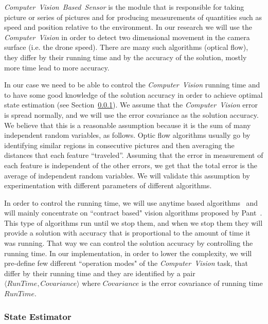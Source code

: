 \documentclass[11pt]{article}
\begin{document}
\textit{Computer~Vision~Based~Sensor} is the module that is responsible for taking picture or series of pictures and for producing measurements of quantities such as speed and position relative to the environment.
In our research we will use the \textit{Computer~Vision} in order to detect two dimensional movement in the camera surface (i.e. the drone speed).
There are many such algorithms (optical flow), they differ by their running time and by the accuracy of the solution, mostly more time lead to more accuracy.

In our case we need to be able to control the \textit{Computer~Vision} running time and to have some good knowledge of the solution accuracy in order to achieve optimal state estimation (see Section~\ref{sec:estimator}).
We assume that the \textit{Computer~Vision} error is spread normally, and we will use the error covariance as the solution accuracy. 
We believe that this is a reasonable  assumption because it is the sum of many independent random variables, as follows. Optic flow algorithms usually go by identifying similar regions in consecutive pictures and then averaging the distances that each feature ``traveled''. Assuming that the error in measurement of each feature is independent of the other errors, we get that the total error is the average of independent random variables. We will validate this assumption by experimentation with different parameters of different algorithms.

In order to control the running time, we will use anytime based algorithms~\cite{Shlomo} and will mainly concentrate on ``contract based" vision algorithms proposed by Pant~\cite{UPenn-Pant}.
This type of algorithms run until we stop them, and when we stop them they will provide a solution with accuracy that is proportional to the amount of time it was running. That way we can control the solution accuracy by controlling the running time.
In our implementation, in order to lower the complexity, we will pre-define few different ``operation modes" of the \textit{Computer~Vision} task, that differ by their running time and they are identified by a pair $\langle RunTime, Covariance \rangle$ where $Covariance$ is the error covariance of running time $RunTime$.

\subsubsection{State Estimator}
\label{sec:estimator}
\end{document}
